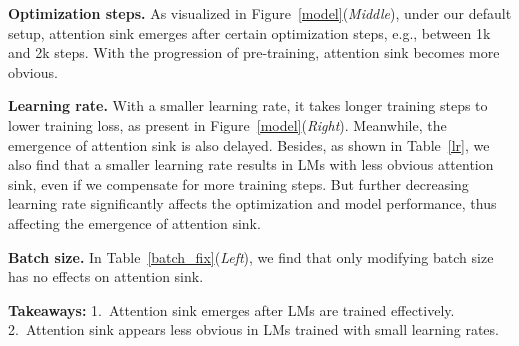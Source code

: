 

\textbf{Optimization steps.} As visualized in Figure~\ref{model}(\emph{Middle}), under our default setup, attention sink emerges after certain optimization steps, e.g., between 1k and 2k steps. With the progression of pre-training, attention sink becomes more obvious. 

\textbf{Learning rate.} With a smaller learning rate, it takes longer training steps to lower training loss, as present in Figure~\ref{model}(\emph{Right}). Meanwhile, the emergence of attention sink is also delayed. Besides, as shown in Table~\ref{lr}, we also find that a smaller learning rate results in LMs with less obvious attention sink, even if we compensate for more training steps.  But further decreasing learning rate significantly affects the optimization and model performance, thus affecting the emergence of attention sink.

\textbf{Batch size.} In Table~\ref{batch_fix}(\emph{Left}), we find that only modifying batch size has no effects on attention sink.

\vspace{-0.1cm}
\begin{abox} %
     \textbf{Takeaways:} 1.~Attention sink emerges after LMs are trained effectively. 2.~Attention sink appears less obvious in LMs trained with small learning rates.%
\end{abox}


